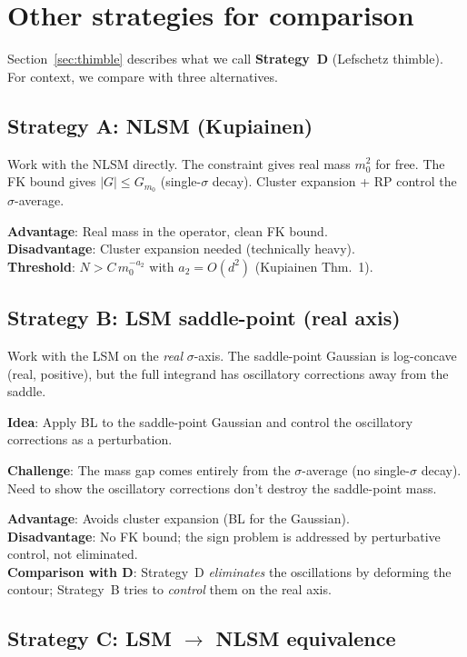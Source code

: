 \documentclass[12pt]{article}
\theoremstyle{definition}
\theoremstyle{remark}
\begin{document}
\section{Other strategies for comparison}

Section~\ref{sec:thimble} describes what we call \textbf{Strategy~D}
(Lefschetz thimble). For context, we compare with three alternatives.

\subsection{Strategy A: NLSM (Kupiainen)}

Work with the NLSM directly. The constraint gives real mass $m_0^2$
for free. The FK bound gives $|G| \le G_{m_0}$ (single-$\sigma$
decay). Cluster expansion + RP control the $\sigma$-average.

\textbf{Advantage}: Real mass in the operator, clean FK bound.\\
\textbf{Disadvantage}: Cluster expansion needed (technically heavy).\\
\textbf{Threshold}: $N > C\,m_0^{-a_2}$ with $a_2 = O(d^2)$
(Kupiainen Thm.~1).

\subsection{Strategy B: LSM saddle-point (real axis)}

Work with the LSM on the \emph{real} $\sigma$-axis. The saddle-point
Gaussian is log-concave (real, positive), but the full integrand has
oscillatory corrections away from the saddle.

\textbf{Idea}: Apply BL to the saddle-point Gaussian and control the
oscillatory corrections as a perturbation.

\textbf{Challenge}: The mass gap comes entirely from the $\sigma$-average
(no single-$\sigma$ decay). Need to show the oscillatory corrections
don't destroy the saddle-point mass.

\textbf{Advantage}: Avoids cluster expansion (BL for the Gaussian).\\
\textbf{Disadvantage}: No FK bound; the sign problem is addressed
by perturbative control, not eliminated.\\
\textbf{Comparison with D}: Strategy~D \emph{eliminates} the
oscillations by deforming the contour; Strategy~B tries to
\emph{control} them on the real axis.

\subsection{Strategy C: LSM $\to$ NLSM equivalence}
\end{document}
